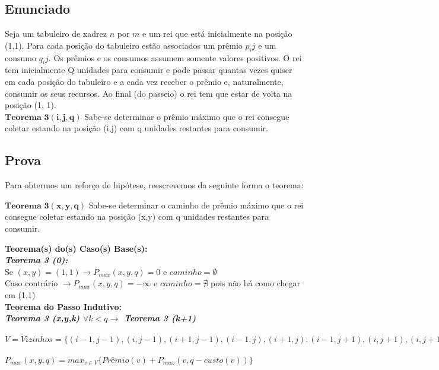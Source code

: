 \documentclass[12pt]{article}
\begin{document}
\subsection{ Enunciado }
\indent Seja um tabuleiro de xadrez $n$ por $m$ e um rei que está inicialmente na posição (1,1). Para cada posição do tabuleiro estão associados um prêmio $p_ij$ e um consumo $q_ij$. Os prêmios e os consumos assumem somente valores positivos.
O rei tem inicialmente Q unidades para consumir e pode passar quantas vezes quiser em cada
posição do tabuleiro e a cada vez receber o prêmio e, naturalmente, consumir os seus recursos. Ao final (do passeio) o rei tem que estar de volta na posição (1, 1).\\

$\mathbf{Teorema}$ $\mathbf{3}$$\mathbf{(i,j,q)}$ Sabe-se determinar o prêmio máximo que o rei consegue coletar estando na posição (i,j) com q unidades restantes para consumir.\\

\subsection{ Prova }
Para obtermos um reforço de hipótese, reescrevemos da seguinte forma o teorema:

$\mathbf{Teorema}$ $\mathbf{3}$$\mathbf{(x,y,q)}$ Sabe-se determinar o caminho de prêmio máximo que o rei consegue coletar estando na posição (x,y) com q unidades restantes para consumir.\\

\indent 

\textbf{Teorema(s) do(s) Caso(s) Base(s):}\\

\textit{\textbf{Teorema 3 (0):}}\\
Se $ (x,y)=(1,1) \rightarrow P_{max}(x,y,q) = 0$ e $caminho = \emptyset $\\
Caso contrário $\rightarrow P_{max}(x,y,q) = -\infty $ e $caminho = \nexists $ pois não há como chegar em (1,1) \\ 

\textbf{Teorema do Passo Indutivo:}\\

\textit{\textbf{Teorema 3 (x,y,k) $\forall k < q \rightarrow$ Teorema 3 (k+1)}}\\
\\
$V = Vizinhos = \{(i-1,j-1),(i,j-1),(i+1,j-1),(i-1,j),(i+1,j),(i-1,j+1),(i,j+1),(i,j+1),(i+1,j+1)\}$\\ 
\\
$P_{max}(x,y,q) = max_{v \in V}\{Prêmio(v) + P_{max}(v,q-custo(v))\}$\\
\end{document}
